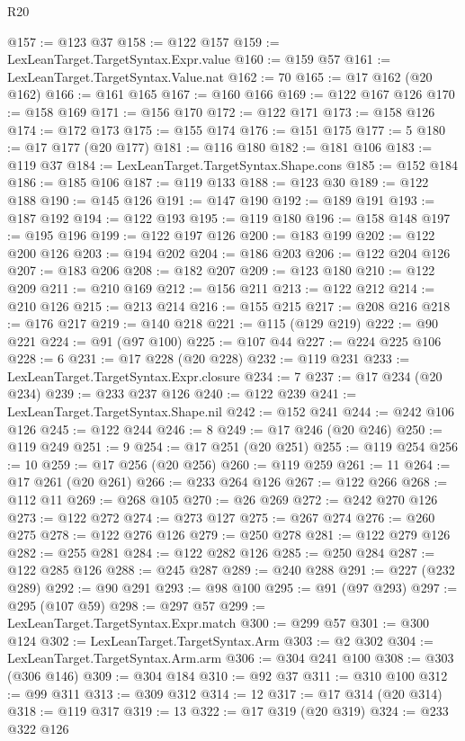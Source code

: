 \begin{lexlean}{R20}
\begin{coremodule}
@157 := @123 @37
@158 := @122 @157
@159 := LexLeanTarget.TargetSyntax.Expr.value
@160 := @159 @57
@161 := LexLeanTarget.TargetSyntax.Value.nat
@162 := 70
@165 := @17 @162 (@20 @162)
@166 := @161 @165
@167 := @160 @166
@169 := @122 @167 @126
@170 := @158 @169
@171 := @156 @170
@172 := @122 @171
@173 := @158 @126
@174 := @172 @173
@175 := @155 @174
@176 := @151 @175
@177 := 5
@180 := @17 @177 (@20 @177)
@181 := @116 @180
@182 := @181 @106
@183 := @119 @37
@184 := LexLeanTarget.TargetSyntax.Shape.cons
@185 := @152 @184
@186 := @185 @106
@187 := @119 @133
@188 := @123 @30
@189 := @122 @188
@190 := @145 @126
@191 := @147 @190
@192 := @189 @191
@193 := @187 @192
@194 := @122 @193
@195 := @119 @180
@196 := @158 @148
@197 := @195 @196
@199 := @122 @197 @126
@200 := @183 @199
@202 := @122 @200 @126
@203 := @194 @202
@204 := @186 @203
@206 := @122 @204 @126
@207 := @183 @206
@208 := @182 @207
@209 := @123 @180
@210 := @122 @209
@211 := @210 @169
@212 := @156 @211
@213 := @122 @212
@214 := @210 @126
@215 := @213 @214
@216 := @155 @215
@217 := @208 @216
@218 := @176 @217
@219 := @140 @218
@221 := @115 (@129 @219)
@222 := @90 @221
@224 := @91 (@97 @100)
@225 := @107 @44
@227 := @224 @225 @106
@228 := 6
@231 := @17 @228 (@20 @228)
@232 := @119 @231
@233 := LexLeanTarget.TargetSyntax.Expr.closure
@234 := 7
@237 := @17 @234 (@20 @234)
@239 := @233 @237 @126
@240 := @122 @239
@241 := LexLeanTarget.TargetSyntax.Shape.nil
@242 := @152 @241
@244 := @242 @106 @126
@245 := @122 @244
@246 := 8
@249 := @17 @246 (@20 @246)
@250 := @119 @249
@251 := 9
@254 := @17 @251 (@20 @251)
@255 := @119 @254
@256 := 10
@259 := @17 @256 (@20 @256)
@260 := @119 @259
@261 := 11
@264 := @17 @261 (@20 @261)
@266 := @233 @264 @126
@267 := @122 @266
@268 := @112 @11
@269 := @268 @105
@270 := @26 @269
@272 := @242 @270 @126
@273 := @122 @272
@274 := @273 @127
@275 := @267 @274
@276 := @260 @275
@278 := @122 @276 @126
@279 := @250 @278
@281 := @122 @279 @126
@282 := @255 @281
@284 := @122 @282 @126
@285 := @250 @284
@287 := @122 @285 @126
@288 := @245 @287
@289 := @240 @288
@291 := @227 (@232 @289)
@292 := @90 @291
@293 := @98 @100
@295 := @91 (@97 @293)
@297 := @295 (@107 @59)
@298 := @297 @57
@299 := LexLeanTarget.TargetSyntax.Expr.match
@300 := @299 @57
@301 := @300 @124
@302 := LexLeanTarget.TargetSyntax.Arm
@303 := @2 @302
@304 := LexLeanTarget.TargetSyntax.Arm.arm
@306 := @304 @241 @100
@308 := @303 (@306 @146)
@309 := @304 @184
@310 := @92 @37
@311 := @310 @100
@312 := @99 @311
@313 := @309 @312
@314 := 12
@317 := @17 @314 (@20 @314)
@318 := @119 @317
@319 := 13
@322 := @17 @319 (@20 @319)
@324 := @233 @322 @126

\end{coremodule}
\end{lexlean}
